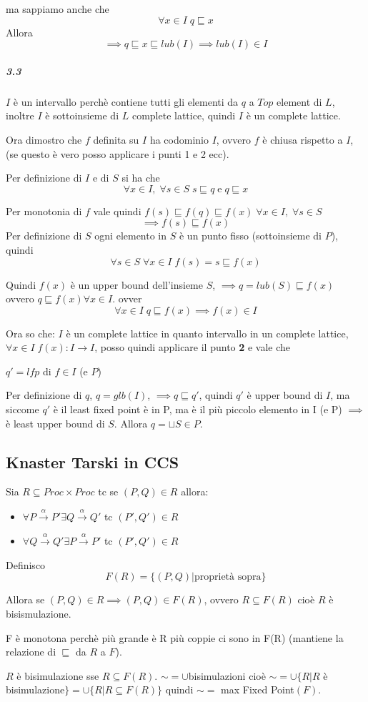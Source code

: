 \documentclass{article}
\newcommand{\passo}{\xrightarrow{\alpha}}
\begin{document}
ma sappiamo anche che $$\forall x \in I \; q \sqsubseteq x$$ 
Allora
$$\implies q \sqsubseteq x \sqsubseteq lub(I) \implies lub(I) \in I$$

\subparagraph{3.3}

$I$ è un intervallo perchè contiene tutti gli elementi da $q$ a $Top $ element  di $L$, inoltre $I$ è sottoinsieme di $L$ complete lattice, quindi $I$ è un complete lattice.

Ora dimostro che $f$ definita su $I$ ha codominio $I$, ovvero $f$ è chiusa rispetto a $I$, (se questo è vero posso applicare i punti 1 e 2 ecc). 

Per definizione di $I$ e di $S$ si ha che $$ \forall x \in I, \; \forall s \in S \; s \sqsubseteq q\; \text{e}\; q \sqsubseteq x  $$

Per monotonia di $f$ vale quindi $f(s)\sqsubseteq f(q)\sqsubseteq f(x)\; \forall x \in I, \; \forall s \in S  $
$$\implies f(s) \sqsubseteq f(x)$$
Per definizione di $S$ ogni elemento in $S$ è un punto fisso (sottoinsieme di $P$), quindi $$\forall s \in S \; \forall x \in I \; f(s)=s\sqsubseteq f(x)$$

Quindi $f(x)$ è un upper bound dell'insieme $S$, $\implies q=lub(S) \sqsubseteq f(x) $ ovvero $q\sqsubseteq f(x) \forall x \in I$. ovver $$ \forall x \in I \; q \sqsubseteq f(x) \implies f(x) \in I$$

Ora so che: $I$ è un complete lattice in quanto intervallo in un complete lattice, $\forall x \in I \; f(x):I \to I$, posso quindi applicare il punto \textbf{2} e vale che 
\begin{center}
$q'=lfp$ di $f \in I$ (e $P$)
\end{center}

Per definizione di $q$, $q=glb(I)$, $\implies q \sqsubseteq q'$, quindi $q'$ è upper bound di $I$, ma siccome $q'$ è il least fixed point è in P, ma è il più piccolo elemento in I (e P) $\implies$ è least upper bound di $S$.
Allora $q= \sqcup S \in P$. 

\subsection{Knaster Tarski in CCS}

Sia $R \subseteq Proc \times Proc$ tc se $(P, Q) \in R$ allora:
\begin{itemize}
    \item $\forall P \passo P' \exists Q \passo Q'$ tc $(P', Q') \in R$
    \item $\forall Q \passo Q' \exists P \passo P'$ tc $(P', Q') \in R$
\end{itemize}

Definisco $$F(R) = \{ (P,Q) | \text{proprietà sopra} \} $$

Allora se $(P,Q) \in R \implies (P,Q) \in F(R)$, ovvero $R \subseteq F(R)$ cioè $R$ è bisismulazione.

F è monotona perchè più grande è R più coppie ci sono in F(R) (mantiene la relazione di $\sqsubseteq$ da $R$ a $F$).

$R$ è bisimulazione sse $R \subseteq F(R)$. $ \sim= \cup$bisimulazioni cioè $\sim = \cup \{ R |R $ è bisimulazione$\} = \cup \{R | R \subseteq F(R)\} $ quindi $\sim = $ max Fixed Point$(F)$.
\end{document}
